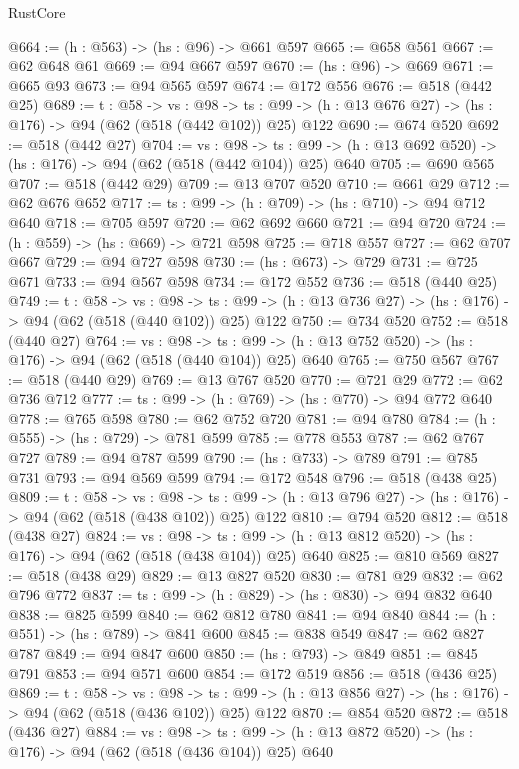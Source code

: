 \begin{lexlean}{RustCore}
\begin{coremodule}
@664 := (h : @563) -> (hs : @96) -> @661 @597
@665 := @658 @561
@667 := @62 @648 @61
@669 := @94 @667 @597
@670 := (hs : @96) -> @669
@671 := @665 @93
@673 := @94 @565 @597
@674 := @172 @556
@676 := @518 (@442 @25)
@689 := {t : @58} ->
  {vs : @98} ->
  {ts : @99} -> (h : @13 @676 @27) -> (hs : @176) -> @94 (@62 (@518 (@442 @102)) @25) @122
@690 := @674 @520
@692 := @518 (@442 @27)
@704 := {vs : @98} ->
  {ts : @99} -> (h : @13 @692 @520) -> (hs : @176) -> @94 (@62 (@518 (@442 @104)) @25) @640
@705 := @690 @565
@707 := @518 (@442 @29)
@709 := @13 @707 @520
@710 := @661 @29
@712 := @62 @676 @652
@717 := {ts : @99} -> (h : @709) -> (hs : @710) -> @94 @712 @640
@718 := @705 @597
@720 := @62 @692 @660
@721 := @94 @720
@724 := (h : @559) -> (hs : @669) -> @721 @598
@725 := @718 @557
@727 := @62 @707 @667
@729 := @94 @727 @598
@730 := (hs : @673) -> @729
@731 := @725 @671
@733 := @94 @567 @598
@734 := @172 @552
@736 := @518 (@440 @25)
@749 := {t : @58} ->
  {vs : @98} ->
  {ts : @99} -> (h : @13 @736 @27) -> (hs : @176) -> @94 (@62 (@518 (@440 @102)) @25) @122
@750 := @734 @520
@752 := @518 (@440 @27)
@764 := {vs : @98} ->
  {ts : @99} -> (h : @13 @752 @520) -> (hs : @176) -> @94 (@62 (@518 (@440 @104)) @25) @640
@765 := @750 @567
@767 := @518 (@440 @29)
@769 := @13 @767 @520
@770 := @721 @29
@772 := @62 @736 @712
@777 := {ts : @99} -> (h : @769) -> (hs : @770) -> @94 @772 @640
@778 := @765 @598
@780 := @62 @752 @720
@781 := @94 @780
@784 := (h : @555) -> (hs : @729) -> @781 @599
@785 := @778 @553
@787 := @62 @767 @727
@789 := @94 @787 @599
@790 := (hs : @733) -> @789
@791 := @785 @731
@793 := @94 @569 @599
@794 := @172 @548
@796 := @518 (@438 @25)
@809 := {t : @58} ->
  {vs : @98} ->
  {ts : @99} -> (h : @13 @796 @27) -> (hs : @176) -> @94 (@62 (@518 (@438 @102)) @25) @122
@810 := @794 @520
@812 := @518 (@438 @27)
@824 := {vs : @98} ->
  {ts : @99} -> (h : @13 @812 @520) -> (hs : @176) -> @94 (@62 (@518 (@438 @104)) @25) @640
@825 := @810 @569
@827 := @518 (@438 @29)
@829 := @13 @827 @520
@830 := @781 @29
@832 := @62 @796 @772
@837 := {ts : @99} -> (h : @829) -> (hs : @830) -> @94 @832 @640
@838 := @825 @599
@840 := @62 @812 @780
@841 := @94 @840
@844 := (h : @551) -> (hs : @789) -> @841 @600
@845 := @838 @549
@847 := @62 @827 @787
@849 := @94 @847 @600
@850 := (hs : @793) -> @849
@851 := @845 @791
@853 := @94 @571 @600
@854 := @172 @519
@856 := @518 (@436 @25)
@869 := {t : @58} ->
  {vs : @98} ->
  {ts : @99} -> (h : @13 @856 @27) -> (hs : @176) -> @94 (@62 (@518 (@436 @102)) @25) @122
@870 := @854 @520
@872 := @518 (@436 @27)
@884 := {vs : @98} ->
  {ts : @99} -> (h : @13 @872 @520) -> (hs : @176) -> @94 (@62 (@518 (@436 @104)) @25) @640

\end{coremodule}
\end{lexlean}

